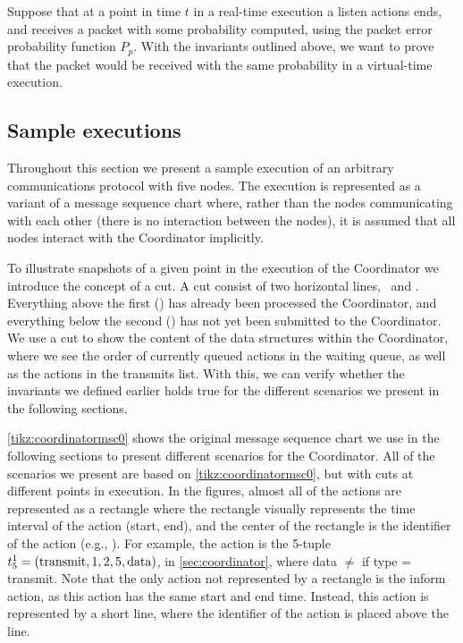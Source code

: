 Suppose that at a point in time $t$ in a real-time execution a listen actions ends, and receives a packet with some probability computed, using the packet error probability function $P_p$. With the invariants outlined above, we want to prove that the packet would be received with the same probability in a virtual-time execution.



\subsection{Sample executions}\label{sec:coordinator-examples}
Throughout this section we present a sample execution of an arbitrary communications protocol with five nodes. The execution is represented as a variant of a message sequence chart where, rather than the nodes communicating with each other (there is no interaction between the nodes), it is assumed that all nodes interact with the Coordinator implicitly. \smallbreak

To illustrate snapshots of a given point in the execution of the Coordinator we introduce the concept of a cut. A cut consist of two horizontal lines, \ProcessedLine\ and \SubmittedLine. Everything above the first (\ProcessedLine) has already been processed the Coordinator, and everything below the second (\SubmittedLine) has not yet been submitted to the Coordinator. We use a cut to show the content of the data structures within the Coordinator, where we see the order of currently queued actions in the waiting queue, as well as the actions in the transmits list. With this, we can verify whether the invariants we defined earlier holds true for the different scenarios we present in the following sections. \smallbreak

\autoref{tikz:coordinatormsc0} shows the original message sequence chart we use in the following sections to present different scenarios for the Coordinator. All of the scenarios we present are based on \autoref{tikz:coordinatormsc0}, but with cuts at different points in execution. In the figures, almost all of the actions are represented as a rectangle where the rectangle visually represents the time interval of the action (start, end), and the center of the rectangle is the identifier of the action (e.g., ). For example, the action  is the 5-tuple $t^{1}_{5} = (\text{transmit}, 1, 2, 5, \text{data})$, in \autoref{sec:coordinator}, where data $\neq$ \KwNull if type = transmit. Note that the only action not represented by a rectangle is the inform action, as this action has the same start and end time. Instead, this action is represented by a short line, where the identifier of the action is placed above the line.


